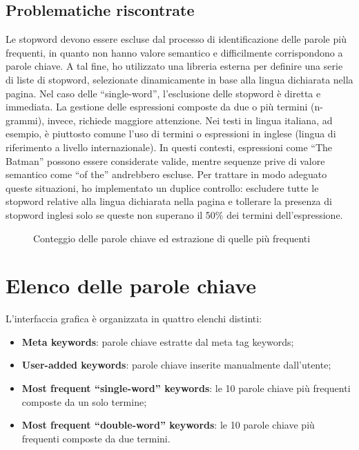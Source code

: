\subsection{Problematiche riscontrate}

\par Le \gls{stopword} devono essere escluse dal processo di identificazione delle parole più frequenti, in quanto non hanno valore semantico e difficilmente corrispondono a parole chiave. A tal fine, ho utilizzato una libreria esterna per definire una serie di liste di \gls{stopword}, selezionate dinamicamente in base alla lingua dichiarata nella pagina. Nel caso delle “single-word”, l’esclusione delle \gls{stopword} è diretta e immediata. La gestione delle espressioni composte da due o più termini (n-grammi), invece, richiede maggiore attenzione. Nei testi in lingua italiana, ad esempio, è piuttosto comune l’uso di termini o espressioni in inglese (lingua di riferimento a livello internazionale). In questi contesti, espressioni come “The Batman” possono essere considerate valide, mentre sequenze prive di valore semantico come “of the” andrebbero escluse. Per trattare in modo adeguato queste situazioni, ho implementato un duplice controllo: escludere tutte le \gls{stopword} relative alla lingua dichiarata nella pagina e tollerare la presenza di \gls{stopword} inglesi solo se queste non superano il 50\% dei termini dell’espressione.

\begin{figure}[H]
  \centering 
  \caption{Conteggio delle parole chiave ed estrazione di quelle più frequenti}
\end{figure}

\section{Elenco delle parole chiave}
\label{sec:keyword-list}

\par L'interfaccia grafica è organizzata in quattro elenchi distinti: 
\begin{itemize}
  \item \textbf{Meta keywords}: parole chiave estratte dal meta tag keywords;
  \item \textbf{User-added keywords}: parole chiave inserite manualmente dall'utente;
  \item \textbf{Most frequent “single-word” keywords}: le 10 parole chiave più frequenti composte da un solo termine;
  \item \textbf{Most frequent “double-word” keywords}: le 10 parole chiave più frequenti composte da due termini.
\end{itemize}

